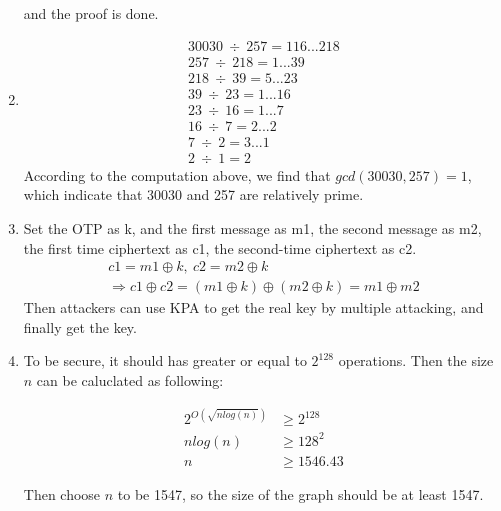 \documentclass[12pt, a4paper]{article}
\begin{document}
\begin{enumerate}
and the proof is done.
\item \begin{equation*}
\begin{split}
    30030\ \div\ 257 = 116...218\\
    257\ \div\ 218 = 1...39\\
    218\ \div\ 39 = 5...23\\
    39\ \div\ 23 = 1...16\\
    23\ \div\ 16 = 1...7\\
    16\ \div\ 7 = 2...2\\
    7\ \div\ 2 = 3...1\\
    2\ \div\ 1 = 2
\end{split}
\end{equation*}
According to the computation above, we find that $gcd(30030, 257) = 1$, which indicate that 30030 and 257 are relatively prime.
\item Set the OTP as k, and the first message as m1, the second message as m2, the first time ciphertext as c1, 
      the second-time ciphertext as c2.
      \begin{equation*}
        \begin{split}
            c1 = m1 \oplus k,\ c2 = m2 \oplus k\\
            \Rightarrow c1 \oplus c2 = (m1 \oplus k) \oplus (m2 \oplus k) = m1 \oplus m2
        \end{split}
      \end{equation*}
      Then attackers can use KPA to get the real key by multiple attacking, and finally get the key.
\item To be secure, it should has greater or equal to $2^{128}$ operations. Then the size $n$ can be caluclated as following:
      
        \begin{align*}
            2^{O(\sqrt{nlog(n)})} &\geq 2^{128}\\
            nlog(n) &\geq 128^2\\
            n &\geq 1546.43
        \end{align*}
      
      Then choose $n$ to be 1547, so the size of the graph should be at least 1547.
\end{enumerate}

\newpage
\end{document}
